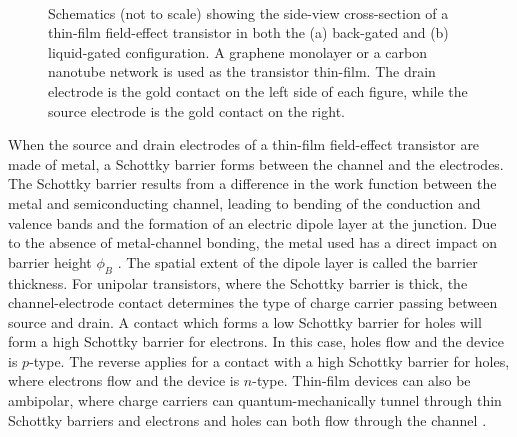 \documentclass[
  a4paper,
]{scrbook}
\begin{document}
\begin{figure}
\begin{minipage}[t]{0.01\linewidth}
{\centering 

~

}

\end{minipage}%

\caption{\label{fig-gating-schematics}Schematics (not to scale) showing
the side-view cross-section of a thin-film field-effect transistor in
both the (a) back-gated and (b) liquid-gated configuration. A graphene
monolayer or a carbon nanotube network is used as the transistor
thin-film. The drain electrode is the gold contact on the left side of
each figure, while the source electrode is the gold contact on the
right.}

\end{figure}

When the source and drain electrodes of a thin-film field-effect
transistor are made of metal, a Schottky barrier forms between the
channel and the electrodes. The Schottky barrier results from a
difference in the work function between the metal and semiconducting
channel, leading to bending of the conduction and valence bands and the
formation of an electric dipole layer at the junction. Due to the
absence of metal-channel bonding, the metal used has a direct impact on
barrier height \(\phi_B\) \autocite{Avouris2007,Li2023}. The spatial
extent of the dipole layer is called the barrier thickness. For unipolar
transistors, where the Schottky barrier is thick, the channel-electrode
contact determines the type of charge carrier passing between source and
drain. A contact which forms a low Schottky barrier for holes will form
a high Schottky barrier for electrons. In this case, holes flow and the
device is \(p\)-type. The reverse applies for a contact with a high
Schottky barrier for holes, where electrons flow and the device is
\(n\)-type. Thin-film devices can also be ambipolar, where charge
carriers can quantum-mechanically tunnel through thin Schottky barriers
and electrons and holes can both flow through the channel
\autocite{Avouris2007,Heller2008,Shkodra2021,Yao2021}.
\end{document}
